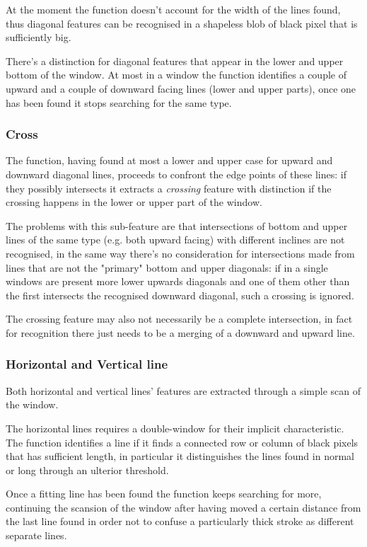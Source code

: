 At the moment the function doesn't account for the width of the lines found, thus diagonal features can be recognised in a shapeless blob of black pixel that is sufficiently big. 
   
There's a distinction for diagonal features that appear in the lower and upper bottom of the window.
At most in a window the function identifies a couple of upward and a couple of downward facing lines (lower and upper parts), once one has been found it stops searching for the same type.

\subsubsection{Cross}
The function, having found at most a lower and upper case for upward and downward diagonal lines, proceeds to confront the edge points of these lines: if they possibly intersects it extracts a \emph{crossing} feature with distinction if the crossing happens in the lower or upper part of the window. 

The problems with this sub-feature are that intersections of bottom and upper lines of the same type (e.g. both upward facing) with different inclines are not recognised, in the same way there's no consideration for intersections made from lines that are not the "primary" bottom and upper diagonals: if in a single windows are present more lower upwards diagonals and one of them other than the first intersects the recognised downward diagonal, such a crossing is ignored.

The crossing feature may also not necessarily be a complete intersection, in fact for recognition there just needs to be a merging of a downward and upward line. 


\subsubsection{Horizontal and Vertical line}
Both horizontal and vertical lines' features are extracted through
a simple scan of the window.

The horizontal lines requires a double-window for their implicit characteristic.
The function identifies a line if it finds a connected row or column of black pixels that has sufficient length, in particular it distinguishes the lines found in normal or long through an ulterior threshold.

Once a fitting line has been found the function keeps searching for more, continuing the scansion of the window after having moved a certain distance from the last line found in order not to confuse a particularly thick stroke as different separate lines.

